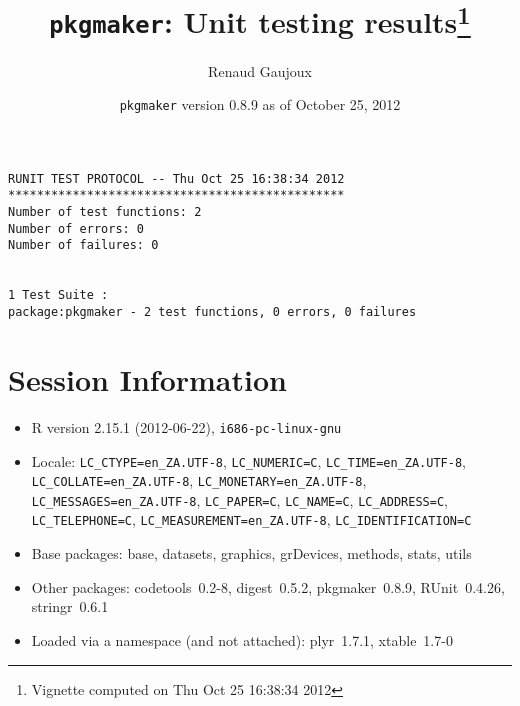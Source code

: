 \documentclass[10pt]{article}
\author{Renaud Gaujoux}
\title{\texttt{pkgmaker}: Unit testing results\footnote{Vignette computed  on Thu Oct 25 16:38:34 2012}}
\date{\texttt{pkgmaker} version 0.8.9 as of October 25, 2012}
\begin{document}
\maketitle

\begin{verbatim}
RUNIT TEST PROTOCOL -- Thu Oct 25 16:38:34 2012 
*********************************************** 
Number of test functions: 2 
Number of errors: 0 
Number of failures: 0 

 
1 Test Suite : 
package:pkgmaker - 2 test functions, 0 errors, 0 failures
\end{verbatim}

\section*{Session Information}
\begin{itemize}\raggedright
  \item R version 2.15.1 (2012-06-22), \verb|i686-pc-linux-gnu|
  \item Locale: \verb|LC_CTYPE=en_ZA.UTF-8|, \verb|LC_NUMERIC=C|, \verb|LC_TIME=en_ZA.UTF-8|, \verb|LC_COLLATE=en_ZA.UTF-8|, \verb|LC_MONETARY=en_ZA.UTF-8|, \verb|LC_MESSAGES=en_ZA.UTF-8|, \verb|LC_PAPER=C|, \verb|LC_NAME=C|, \verb|LC_ADDRESS=C|, \verb|LC_TELEPHONE=C|, \verb|LC_MEASUREMENT=en_ZA.UTF-8|, \verb|LC_IDENTIFICATION=C|
  \item Base packages: base, datasets, graphics, grDevices, methods,
    stats, utils
  \item Other packages: codetools~0.2-8, digest~0.5.2, pkgmaker~0.8.9,
    RUnit~0.4.26, stringr~0.6.1
  \item Loaded via a namespace (and not attached): plyr~1.7.1,
    xtable~1.7-0
\end{itemize}
\end{document}
